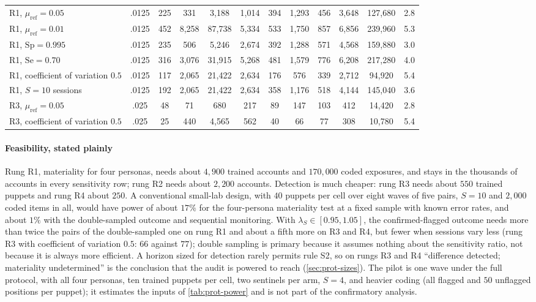 \begin{table}[tbp]
\begin{tabularx}{\textwidth}{@{}>{\raggedright\arraybackslash}Xccccccccccc@{}}
R1, $\mu_{\mathrm{ref}}=0.05$ & .0125 & 225 & 331 & 3{,}188 & 1{,}014 & 394 & 1{,}293 & 456 & 3{,}648 & 127{,}680 & 2.8 \\
R1, $\mu_{\mathrm{ref}}=0.01$ & .0125 & 452 & 8{,}258 & 87{,}738 & 5{,}334 & 533 & 1{,}750 & 857 & 6{,}856 & 239{,}960 & 5.3 \\
R1, $\mathrm{Sp}=0.995$ & .0125 & 235 & 506 & 5{,}246 & 2{,}674 & 392 & 1{,}288 & 571 & 4{,}568 & 159{,}880 & 3.0 \\
R1, $\mathrm{Se}=0.70$ & .0125 & 316 & 3{,}076 & 31{,}915 & 5{,}268 & 481 & 1{,}579 & 776 & 6{,}208 & 217{,}280 & 4.0 \\
R1, coefficient of variation $0.5$ & .0125 & 117 & 2{,}065 & 21{,}422 & 2{,}634 & 176 & 576 & 339 & 2{,}712 & 94{,}920 & 5.4 \\
R1, $S=10$ sessions & .0125 & 192 & 2{,}065 & 21{,}422 & 2{,}634 & 358 & 1{,}176 & 518 & 4{,}144 & 145{,}040 & 3.6 \\
R3, $\mu_{\mathrm{ref}}=0.05$ & .025 & 48 & 71 & 680 & 217 & 89 & 147 & 103 & 412 & 14{,}420 & 2.8 \\
R3, coefficient of variation $0.5$ & .025 & 25 & 440 & 4{,}565 & 562 & 40 & 66 & 77 & 308 & 10{,}780 & 5.4 \\
\bottomrule
\end{tabularx}
\end{table}

\paragraph{Feasibility, stated plainly}
Rung R1, materiality for four personas, needs about $4{,}900$ trained accounts and $170{,}000$ coded exposures, and stays in the thousands of accounts in every sensitivity row; rung R2 needs about $2{,}200$ accounts. Detection is much cheaper: rung R3 needs about $550$ trained puppets and rung R4 about $250$. A conventional small-lab design, with $40$ puppets per cell over eight waves of five pairs, $S=10$ and $2{,}000$ coded items in all, would have power of about $17\%$ for the four-persona materiality test at a fixed sample with known error rates, and about $1\%$ with the double-sampled outcome and sequential monitoring. With $\lambda_S\in[0.95,1.05]$, the confirmed-flagged outcome needs more than twice the pairs of the double-sampled one on rung R1 and about a fifth more on R3 and R4, but fewer when sessions vary less (rung R3 with coefficient of variation $0.5$: $66$ against $77$); double sampling is primary because it assumes nothing about the sensitivity ratio, not because it is always more efficient. A horizon sized for detection rarely permits rule S2, so on rungs R3 and R4 ``difference detected; materiality undetermined'' is the conclusion that the audit is powered to reach (\cref{sec:prot-sizes}). The pilot is one wave under the full protocol, with all four personas, ten trained puppets per cell, two sentinels per arm, $S=4$, and heavier coding (all flagged and $50$ unflagged positions per puppet); it estimates the inputs of \cref{tab:prot-power} and is not part of the confirmatory analysis.

